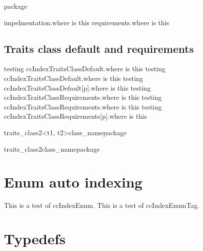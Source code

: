 \documentclass{article}
\begin{document}
{{{{\begin{ccPackage}{package}
\begin{ccIndexGlobalFunctions}
\end{ccIndexGlobalFunctions}
impelmentation\ccIndexImplementation.where is this
requirements\ccIndexRequirements.where is this
\end{ccPackage}

\subsection{Traits class default and requirements}

testing ccIndexTraitsClassDefault.where is this
testing ccIndexTraitsClassDefault.where is this
testing ccIndexTraitsClassDefault[p].where is this
testing ccIndexTraitsClassRequirements.where is this
testing ccIndexTraitsClassRequirements.where is this
testing ccIndexTraitsClassRequirements[p].where is this

\begin{ccTraitsClassTemplate}{traits_class2<t1, t2>}{class_name}{package}
\end{ccTraitsClassTemplate}

\begin{ccTraitsClass}{traits_class2}{class_name}{package}
\end{ccTraitsClass}

\section{Enum auto indexing}


This is a test of ccIndexEnum.
This is a test of ccIndexEnumTag.

\section{Typedefs}

}}}}
\end{document}
